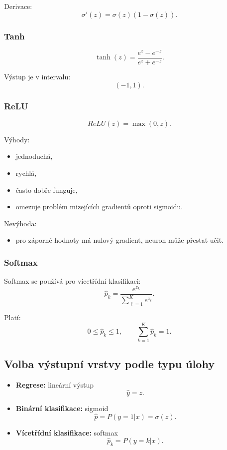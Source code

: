 Derivace:
\[
\sigma'(z)
=
\sigma(z)(1-\sigma(z)).
\]

\subsubsection{Tanh}

\[
\tanh(z)=
\frac{e^z-e^{-z}}{e^z+e^{-z}}.
\]

Výstup je v intervalu:
\[
(-1,1).
\]

\subsubsection{ReLU}

\[
ReLU(z)=
\max(0,z).
\]

Výhody:
\begin{itemize}
    \item jednoduchá,
    \item rychlá,
    \item často dobře funguje,
    \item omezuje problém mizejících gradientů oproti sigmoidu.
\end{itemize}

Nevýhoda:
\begin{itemize}
    \item pro záporné hodnoty má nulový gradient, neuron může přestat učit.
\end{itemize}

\subsubsection{Softmax}

Softmax se používá pro vícetřídní klasifikaci:
\[
\hat{p}_k
=
\frac{e^{z_k}}
{\sum_{\ell=1}^K e^{z_\ell}}.
\]

Platí:
\[
0\leq \hat{p}_k\leq 1,
\qquad
\sum_{k=1}^K \hat{p}_k=1.
\]

\subsection{Volba výstupní vrstvy podle typu úlohy}

\begin{itemize}
    \item \textbf{Regrese:}
    lineární výstup
    \[
    \hat{y}=z.
    \]
    
    \item \textbf{Binární klasifikace:}
    sigmoid
    \[
    \hat{p}=P(y=1|x)=\sigma(z).
    \]
    
    \item \textbf{Vícetřídní klasifikace:}
    softmax
    \[
    \hat{p}_k=P(y=k|x).
    \]
\end{itemize}


